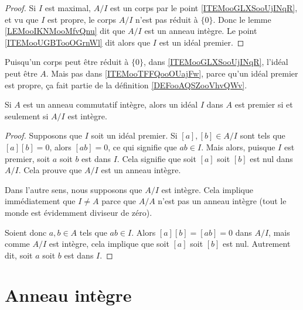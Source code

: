\begin{proof}
	Si \( I\) est maximal, \( A/I\) est un corps par le point \ref{ITEMooGLXSooUjINqR}, et vu que \( I\) est propre, le corps \( A/I\) n'est pas réduit à \( \{ 0 \}\). Donc le lemme \ref{LEMooIKNMooMfvQnu} dit que \( A/I\) est un anneau intègre. Le point \ref{ITEMooUGBTooOGrnWl} dit alors que \( I\) est un idéal premier.
\end{proof}

\begin{remark}
	Puisqu'un corps peut être réduit à \( \{0\}\), dans \ref{ITEMooGLXSooUjINqR}, l'idéal peut être \( A\). Mais pas dans \ref{ITEMooTFFQooOUajFw}, parce qu'un idéal premier est propre, ça fait partie de la définition \ref{DEFooAQSZooVhvQWv}.
\end{remark}

\begin{proposition}     \label{PROPooHABIooBZZQMj}
	Si \( A\) est un anneau commutatif intègre, alors un idéal \( I\) dans \( A\) est premier si et seulement si \( A/I\) est intègre.
\end{proposition}

\begin{proof}
	Supposons que \( I\) soit un idéal premier. Si \( [a],[b] \in A/I\)  sont tels que \( [a][b]=0\), alors \( [ab]=0\), ce qui signifie que \( ab\in I\). Mais alors, puisque \( I\) est premier, soit \( a\) soit \( b\) est dans \( I\). Cela signifie que soit \( [a]\) soit \( [b]\) est nul dans \( A/I\). Cela prouve que \( A/I\) est un anneau intègre.

	Dans l'autre sens, nous supposons que \( A/I\) est intègre. Cela implique immédiatement que \( I\neq A\) parce que \( A/A\) n'est pas un anneau intègre (tout le monde est évidemment diviseur de zéro).

	Soient donc \( a,b\in A\) tels que \( ab\in I\). Alors \( [a][b]=[ab]=0\) dans \( A/I\), mais comme \( A/I\) est intègre, cela implique que soit \( [a]\) soit \( [b]\) est nul. Autrement dit, soit \( a\) soit \( b\) est dans \( I\).
\end{proof}


\section{Anneau intègre}
\label{SECAnneauxIntegres}

